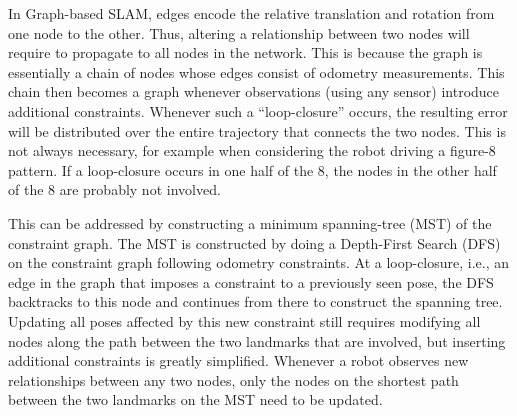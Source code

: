 In Graph-based SLAM, edges encode the relative translation and rotation from one node to the other. Thus, altering a relationship between two nodes will require to propagate to all nodes in the network. This is because the graph is essentially a chain of nodes whose edges consist of odometry measurements. This chain then becomes a graph whenever observations (using any sensor) introduce additional constraints. Whenever such a ``loop-closure'' occurs, the resulting error will be distributed over the entire trajectory that connects the two nodes. This is not always necessary, for example when considering the robot driving a figure-8 pattern. If a loop-closure occurs in one half of the 8, the nodes in the other half of the 8 are probably not involved.

This can be addressed by constructing a  minimum spanning-tree  (MST) of the constraint graph. The MST is constructed by doing a Depth-First Search (DFS) on the constraint graph following odometry constraints. At a loop-closure, i.e., an edge in the graph that imposes a constraint to a previously seen pose, the DFS backtracks to this node and continues from there to construct the spanning tree. Updating all poses affected by this new constraint still requires modifying all nodes along the path between the two landmarks that are involved, but inserting additional constraints is greatly simplified. Whenever a robot observes new relationships between any two nodes, only the nodes on the shortest path between  the two landmarks on the MST need to be updated. %



